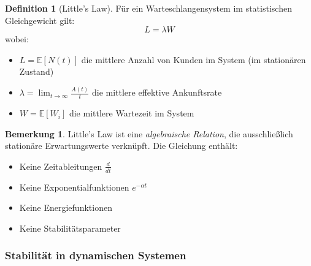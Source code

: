 ﻿\documentclass[a4paper,12pt]{scrreprt}
\theoremstyle{definition}
\newtheorem{definition}{Definition}[section]
\newtheorem{bemerkung}{Bemerkung}[section]
\begin{document}
\begin{definition}[Little's Law]
	Für ein Warteschlangensystem im statistischen Gleichgewicht gilt:
	\begin{equation}
		L = \lambda W
	\end{equation}
	wobei:
	\begin{itemize}
		\item[-] $L = \mathbb{E}[N(t)]$ die mittlere Anzahl von Kunden im System (im stationären Zustand)
		\item[-] $\lambda = \lim_{t \to \infty} \frac{A(t)}{t}$ die mittlere effektive Ankunftsrate
		\item[-] $W = \mathbb{E}[W_i]$ die mittlere Wartezeit im System
	\end{itemize}
\end{definition}

\begin{bemerkung}
	Little's Law ist eine \textit{algebraische Relation}, die ausschließlich stationäre Erwartungswerte verknüpft. Die Gleichung enthält:
	\begin{itemize}
		\item[-] Keine Zeitableitungen $\frac{d}{dt}$
		\item[-] Keine Exponentialfunktionen $e^{-\alpha t}$
		\item[-] Keine Energiefunktionen
		\item[-] Keine Stabilitätsparameter
	\end{itemize}
\end{bemerkung}

\subsubsection{Stabilität in dynamischen Systemen}
\end{document}
